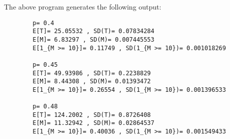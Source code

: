 \documentclass[11pt, letterpaper]{article}
\begin{document}
    The above program generates the following output:
    \begin{verbatim}
        p= 0.4 
        E[T]= 25.05532 , SD(T)= 0.07834284 
        E[M]= 6.83297 , SD(M)= 0.007445553
        E[1_{M >= 10}]= 0.11749 , SD(1_{M >= 10})= 0.001018269 

        p= 0.45 
        E[T]= 49.93986 , SD(T)= 0.2238829 
        E[M]= 8.44308 , SD(M)= 0.01393472
        E[1_{M >= 10}]= 0.26554 , SD(1_{M >= 10})= 0.001396533 

        p= 0.48 
        E[T]= 124.2002 , SD(T)= 0.8726408 
        E[M]= 11.32942 , SD(M)= 0.02864537
        E[1_{M >= 10}]= 0.40036 , SD(1_{M >= 10})= 0.001549433 
    \end{verbatim}
\end{document}
